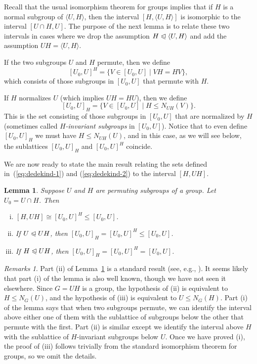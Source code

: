 \documentclass[11pt]{amsart}
\theoremstyle{plain}
\newtheorem{lemma}[theorem]{Lemma}
\theoremstyle{definition}
\theoremstyle{remark}
\newtheorem*{remarks}{Remarks}
\numberwithin{theorem}{section}
\numberwithin{claim}{section}
\numberwithin{equation}{section}
\numberwithin{conjecture}{section}
\newcommand{\<}{\ensuremath{\langle}}
\renewcommand{\>}{\ensuremath{\rangle}}
\renewcommand{\leq}{\ensuremath{\leqslant}}
\newcommand{\subnormal}{\ensuremath{\trianglelefteqslant}}
\newcommand{\0}{\ensuremath{\mathbf{0}}}
\newcommand{\1}{\ensuremath{\mathbf{1}}}
\newcommand{\2}{\ensuremath{\mathbf{2}}}
\newcommand{\3}{\ensuremath{\mathbf{3}}}
\newcommand{\4}{\ensuremath{\mathbf{4}}}
\newcommand{\5}{\ensuremath{\mathbf{5}}}
\begin{document}
Recall that the usual isomorphism theorem for groups implies
that 
if $H$ is a normal subgroup of $\<U, H\>$, 
then the interval
$[H, \<U, H\>]$ is isomorphic to the interval $[U\cap H, U]$.  The 
purpose of the next lemma is to relate these two
intervals in cases where we drop the assumption $H\subnormal \<U,H\>$
and add the assumption $UH = \<U,H\>$.

If the two subgroups $U$ and $H$ permute, then we define 
\begin{equation}
  \label{eq:dedekind-1}
[U_0, U]^H = \{ V\in [U_0,U] \mid VH = HV\},
\end{equation}
which consists of those subgroups in $[U_0, U]$ that permute with
$H$. 

If $H$ normalizes $U$ (which implies $UH=HU$), 
then we %
define
\begin{equation}
  \label{eq:dedekind-2}
[U_0, U]_H = \{ V\in [U_0,U] \mid H\leq N_{UH}(V)\}.
\end{equation}
This is the set consisting of those subgroups in $[U_0, U]$ that
are normalized by $H$ (sometimes called 
\emph{$H$-invariant subgroups} in $[U_0,U]$).
Notice that to even
define $[U_0, U]_H$ we must have $H\leq N_{UH}(U)$, and in this case, as we will
see below, the sublattices 
$[U_0, U]_H$ and $[U_0, U]^H$ coincide.

We are now ready to state the main result relating the sets defined
in~(\ref{eq:dedekind-1}) and (\ref{eq:dedekind-2}) %
to the interval $[H, UH]$.
\begin{lemma}
  \label{lemma-wjd-4}
Suppose $U$ and $H$ are permuting subgroups of a group. %
Let $U_0 = U\cap H$.  Then
\begin{enumerate}[(i)]
\item $[H, UH]  \cong  [U_0, U]^H \leq [U_0, U]$.
\item If $U \subnormal UH$, then  $[U_0, U]_H  = [U_0, U]^H \leq [U_0, U]$.
\item If $H \subnormal UH$,  then  $[U_0, U]_H  = [U_0, U]^H = [U_0, U]$.
\end{enumerate}
\end{lemma}
\begin{remarks}
Part (ii) of Lemma~\ref{lemma-wjd-4} is a standard result (see, e.g.,
\cite{Borner:1999}). It seems likely that part (i) of the lemma is also well
known, though we have not seen it elsewhere. 
Since $G=UH$ is a group, the hypothesis of (ii) is equivalent to
$H\leq N_G(U)$, and the hypothesis of (iii) is equivalent to $U\leq N_G(H)$.
Part (i) of the lemma says that when two subgroups permute, we can
identify the interval above either one of them with the sublattice of
subgroups below the other that permute with the first.
Part (ii) is similar except we identify the interval above $H$ with
the  sublattice of $H$-invariant subgroups below $U$.  Once we have proved (i), the
proof of (iii) follows trivially from the standard isomorphism theorem for
groups, so we omit the details.
\end{remarks}
\end{document}

